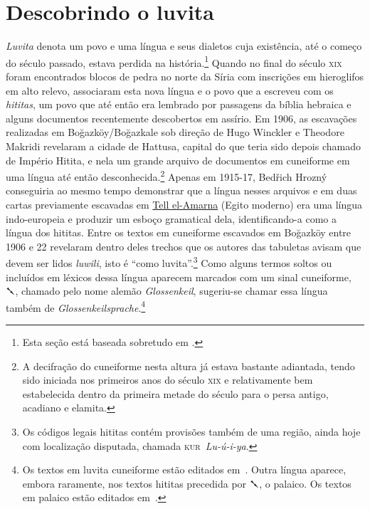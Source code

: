 
\section{Descobrindo o luvita}

\emph{Luvita} denota um povo e uma língua e seus dialetos cuja existência,
até o começo do século passado, estava perdida na história.\footnote{Esta seção
	está baseada sobretudo em \textcite{CHLI11,Melchert2003,Hoffner2008}.}
Quando no final do século \textsc{xix} foram encontrados blocos de pedra no
norte da Síria com inscrições em hieroglifos em alto relevo, associaram esta
nova língua e o povo que a escreveu com os \emph{hititas}, um povo que até
então era lembrado por passagens da bíblia hebraica e alguns documentos
recentemente descobertos em assírio.
Em 1906, as escavações realizadas em Boğazköy\slash{}Boğazkale sob direção de
Hugo Winckler e Theodore Makridi revelaram a cidade de Hattusa,
capital do que teria sido depois chamado de Império Hitita, e nela um grande
arquivo de documentos em cuneiforme em uma língua até então
desconhecida.\footnote{A decifração do cuneiforme nesta altura já estava
	bastante adiantada, tendo sido iniciada nos primeiros anos do século
	\textsc{xix} e relativamente bem estabelecida dentro da primeira metade do
	século para o persa antigo, acadiano e elamita.}
Apenas em 1915-17, Bedřich Hrozný conseguiria ao mesmo tempo demonstrar que a
língua nesses arquivos e em duas cartas previamente escavadas em
\href{https://pleiades.stoa.org/places/149576487}{Tell el-Amarna}
(Egito moderno) era uma língua indo-europeia e produzir um esboço gramatical
dela, identificando-a como a língua dos hititas.
Entre os textos em cuneiforme escavados em Boğazköy entre 1906 e 22 revelaram
dentro deles trechos que os autores das tabuletas avisam que devem ser lidos
\emph{luwili}, isto é ``como luvita''.\footnote{Os códigos legais hititas
	contém provisões também de uma região, ainda hoje
	com localização disputada, chamada \mbox{\textsc{kur} \textit{Lu-ú-i-ya}}.}
Como alguns termos soltos ou incluídos em léxicos dessa língua
aparecem marcados com um sinal cuneiforme, \foreignlanguage{hittite}{𒃵}, chamado
pelo nome alemão \emph{Glossenkeil}, sugeriu-se chamar essa língua também de
\emph{Glossenkeilsprache}.\footnote{Os textos em luvita cuneiforme estão
	editados em~\textcites{Starke1985}{YakubovichMouton2023}.
	Outra língua aparece, embora raramente,
	nos textos hititas precedida por \foreignlanguage{hittite}{𒃵}, o palaico. Os
	textos em palaico estão editados em~\textcite{Carruba1970}.}

